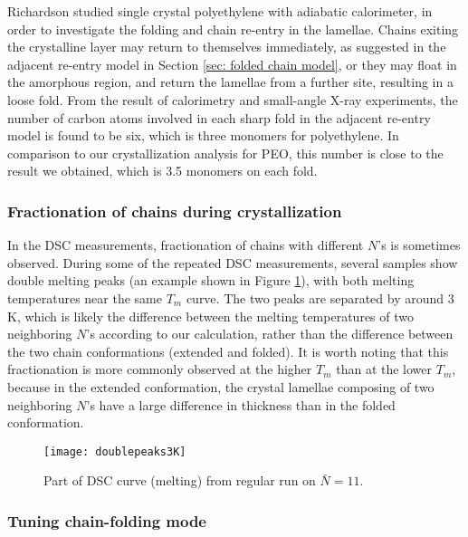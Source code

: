 Richardson \cite{Richardson1965} studied single crystal polyethylene with adiabatic calorimeter, in order to investigate the folding and chain re-entry in the lamellae. Chains exiting the crystalline layer may return to themselves immediately, as suggested in the adjacent re-entry model in Section \ref{sec: folded chain model}, or they may float in the amorphous region, and return the lamellae from a further site, resulting in a loose fold. From the result of calorimetry and small-angle X-ray experiments, the number of carbon atoms involved in each sharp fold in the adjacent re-entry model is found to be six, which is three monomers for polyethylene. In comparison to our crystallization analysis for PEO, this number is close to the result we obtained, which is 3.5 monomers on each fold.

\subsubsection{Fractionation of chains during crystallization}

In the DSC measurements, fractionation of chains with different $N$'s is sometimes observed. During some of the repeated DSC measurements, several samples show double melting peaks (an example shown in Figure \ref{fig:3K difference}), with both melting temperatures near the same $T_{m}$ curve. The two peaks are separated by around 3 K, which is likely the difference between the melting temperatures of two neighboring $N$'s according to our calculation, rather than the difference between the two chain conformations (extended and folded). It is worth noting that this fractionation is more commonly observed at the higher $T_{m}$ than at the lower $T_{m}$, because in the extended conformation, the crystal lamellae composing of two neighboring $N$'s have a large difference in thickness than in the folded conformation.

\begin{figure}[H]
	\center
	\vspace{1 cm}
	\texttt{[image: doublepeaks3K]}
	\caption{Part of DSC curve (melting) from regular run on $\bar{N} = 11$.}
	\label{fig:3K difference}
\end{figure}

\subsubsection{Tuning chain-folding mode}

